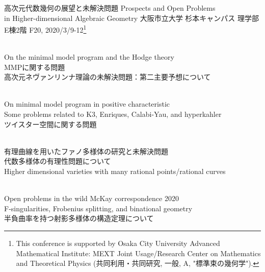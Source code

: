 \documentclass[a4]{jarticle}
\theoremstyle{plain} %
\theoremstyle{definition} %
\begin{document}
\begin{center}
  {\huge 高次元代数幾何の展望と未解決問題}
  \vskip2mm
 {\LARGE Prospects and Open Problems \\ in Higher-dimensional Algebraic Geometry}
\vskip5mm
{\large 大阪市立大学 杉本キャンパス 理学部E棟2階 F20, 2020/3/9-12}\footnote{This conference is supported by Osaka City University Advanced Mathematical Institute: MEXT Joint Usage/Research Center on Mathematics and Theoretical Physics (共同利用・共同研究, 一般, A, "標準束の幾何学"). }
\end{center}

\vskip5mm

\vskip2mm
\\
On the minimal model program and the Hodge theory
\vskip2mm
\\
MMPに関する問題
\vskip2mm
\\
高次元ネヴァンリンナ理論の未解決問題：第二主要予想について
\vskip5mm

\vskip2mm
\\
On minimal model program in positive characteristic
\vskip2mm
\\
Some problems related to K3, Enriques, Calabi-Yau, and hyperkahler 
\vskip2mm
\\
ツイスター空間に関する問題 


\vskip5mm

\vskip2mm
\\
有理曲線を用いたファノ多様体の研究と未解決問題
\vskip2mm
\\
代数多様体の有理性問題について
\vskip2mm
\\
Higher dimensional varieties with many rational points/rational curves

\vskip5mm
\vskip2mm
\\
Open problems in the wild McKay correspondence 2020
\vskip2mm
\\
 F-singularities, Frobenius splitting, and binational geometry 
\vskip2mm
\\
半負曲率を持つ射影多様体の構造定理について
\end{document}
